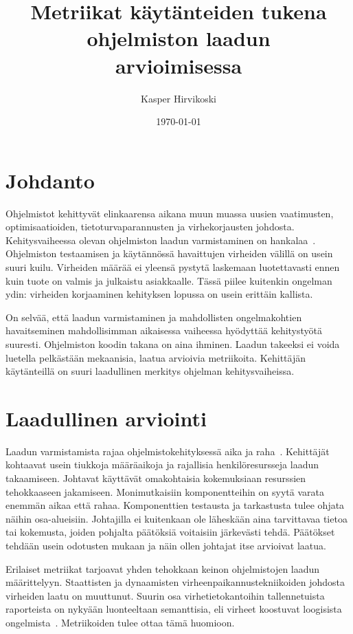 \documentclass[finnish]{../tktltiki2}
\title{Metriikat käytänteiden tukena ohjelmiston laadun\\arvioimisessa}
\author{Kasper Hirvikoski}
\date{\today}
\theoremstyle{definition}
\theoremstyle{remark}
\begin{document}

\maketitle

\tableofcontents
\newpage


\section{Johdanto}

Ohjelmistot kehittyvät elinkaarensa aikana muun muassa uusien vaatimusten, optimisaatioiden, tietoturvaparannusten ja 
virhekorjausten johdosta. Kehitysvaiheessa olevan ohjelmiston laadun varmistaminen on hankalaa~\cite{NB05, ZN08, MND09}. 
Ohjelmiston testaamisen ja käytännössä havaittujen virheiden välillä on usein suuri kuilu. Virheiden määrää ei yleensä 
pystytä laskemaan luotettavasti ennen kuin tuote on valmis ja julkaistu asiakkaalle. Tässä piilee kuitenkin ongelman 
ydin: virheiden korjaaminen kehityksen lopussa on usein erittäin kallista.

    On selvää, että laadun varmistaminen ja mahdollisten ongelmakohtien havaitseminen mahdollisimman aikaisessa 
vaiheessa hyödyttää kehitystyötä suuresti. Ohjelmiston koodin takana on aina ihminen. Laadun takeeksi ei voida luetella 
pelkästään mekaanisia, laatua arvioivia metriikoita. Kehittäjän käytänteillä on suuri laadullinen merkitys ohjelman 
kehitysvaiheissa.

\section{Laadullinen arviointi}

Laadun varmistamista rajaa ohjelmistokehityksessä aika ja raha~\cite{ZN08}. Kehittäjät kohtaavat usein tiukkoja 
määräaikoja ja rajallisia henkilöresursseja laadun takaamiseen. Johtavat käyttävät omakohtaisia kokemuksiaan resurssien 
tehokkaaseen jakamiseen. Monimutkaisiin komponentteihin on syytä varata enemmän aikaa että rahaa. Komponenttien 
testausta ja tarkastusta tulee ohjata näihin osa-alueisiin. Johtajilla ei kuitenkaan ole läheskään aina tarvittavaa 
tietoa tai kokemusta, joiden pohjalta päätöksiä voitaisiin järkevästi tehdä. Päätökset tehdään usein odotusten mukaan ja 
näin ollen johtajat itse arvioivat laatua.

    Erilaiset metriikat tarjoavat yhden tehokkaan keinon ohjelmistojen laadun määrittelyyn. Staattisten ja dynaamisten 
virheenpaikannustekniikoiden johdosta virheiden laatu on muuttunut. Suurin osa virhetietokantoihin tallennetuista 
raporteista on nykyään luonteeltaan semanttisia, eli virheet koostuvat loogisista ongelmista~\cite{ZN08}. Metriikoiden 
tulee ottaa tämä huomioon.
\end{document}
